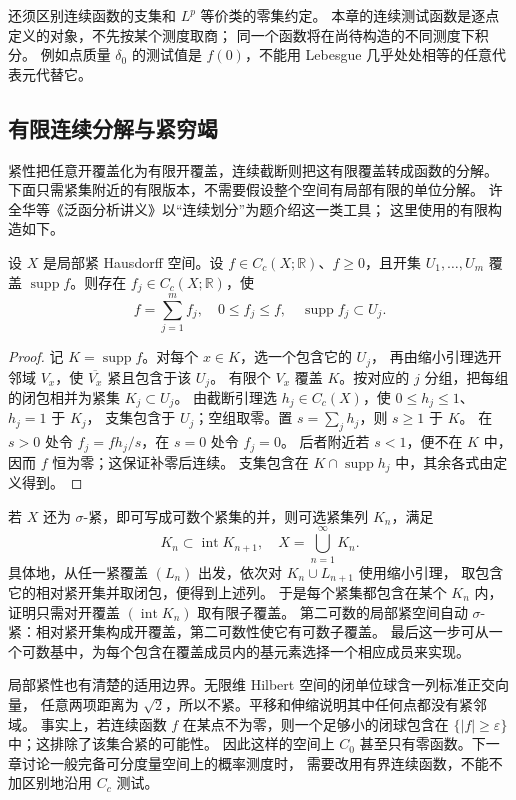 \ProseParagraphBreak

还须区别连续函数的支集和 \(L^p\) 等价类的零集约定。
本章的连续测试函数是逐点定义的对象，不先按某个测度取商；
同一个函数将在尚待构造的不同测度下积分。
例如点质量 \(\delta_0\) 的测试值是 \(f(0)\)，不能用 Lebesgue 几乎处处相等的任意代表元代替它。

\subsection{有限连续分解与紧穷竭}
\label{b1:subsec:110104}

紧性把任意开覆盖化为有限开覆盖，连续截断则把这有限覆盖转成函数的分解。
下面只需紧集附近的有限版本，不需要假设整个空间有局部有限的单位分解。
许全华等《泛函分析讲义》\cite[第10.1节]{Xu2017Fanhan}以“连续划分”为题介绍这一类工具；
这里使用的有限构造如下。

\begin{lemma}\label{b1:lem:cc-finite-decomposition}
设 \(X\) 是局部紧 Hausdorff 空间。设 \(f\in C_c(X;\mathbb R)\)、\(f\geq0\)，且开集 \(U_1,\ldots,U_m\) 覆盖
\(\operatorname{supp}f\)。则存在 \(f_j\in C_c(X;\mathbb R)\)，使
\[
 f=\sum_{j=1}^m f_j,\quad 0\leq f_j\leq f,
 \quad\operatorname{supp}f_j\subset U_j.
\]
\end{lemma}
\begin{proof}
记 \(K=\operatorname{supp}f\)。对每个 \(x\in K\)，选一个包含它的 \(U_j\)，
再由缩小引理选开邻域 \(V_x\)，使 \(\overline{V_x}\) 紧且包含于该 \(U_j\)。
有限个 \(V_x\) 覆盖 \(K\)。按对应的 \(j\) 分组，把每组的闭包相并为紧集 \(K_j\subset U_j\)。
由截断引理选 \(h_j\in C_c(X)\)，使 \(0\leq h_j\leq1\)、\(h_j=1\) 于 \(K_j\)，
支集包含于 \(U_j\)；空组取零。置 \(s=\sum_jh_j\)，则 \(s\geq1\) 于 \(K\)。
在 \(s>0\) 处令 \(f_j=fh_j/s\)，在 \(s=0\) 处令 \(f_j=0\)。
后者附近若 \(s<1\)，便不在 \(K\) 中，因而 \(f\) 恒为零；这保证补零后连续。
支集包含在 \(K\cap\operatorname{supp}h_j\) 中，其余各式由定义得到。
\end{proof}

若 \(X\) 还为 \(\sigma\)-紧，即可写成可数个紧集的并，则可选紧集列 \(K_n\)，满足
\[
 K_n\subset\operatorname{int}K_{n+1},\quad X=\bigcup_{n=1}^\infty K_n.
\]
具体地，从任一紧覆盖 \((L_n)\) 出发，依次对 \(K_n\cup L_{n+1}\) 使用缩小引理，
取包含它的相对紧开集并取闭包，便得到上述列。
于是每个紧集都包含在某个 \(K_n\) 内，证明只需对开覆盖
\((\operatorname{int}K_n)\) 取有限子覆盖。
第二可数的局部紧空间自动 \(\sigma\)-紧：相对紧开集构成开覆盖，第二可数性使它有可数子覆盖。
最后这一步可从一个可数基中，为每个包含在覆盖成员内的基元素选择一个相应成员来实现。

\ProseParagraphBreak

局部紧性也有清楚的适用边界。无限维 Hilbert 空间的闭单位球含一列标准正交向量，
任意两项距离为 \(\sqrt2\)，所以不紧。平移和伸缩说明其中任何点都没有紧邻域。
事实上，若连续函数 \(f\) 在某点不为零，则一个足够小的闭球包含在
\(\{|f|\geq\varepsilon\}\) 中；这排除了该集合紧的可能性。
因此这样的空间上 \(C_0\) 甚至只有零函数。下一章讨论一般完备可分度量空间上的概率测度时，
需要改用有界连续函数，不能不加区别地沿用 \(C_c\) 测试。
